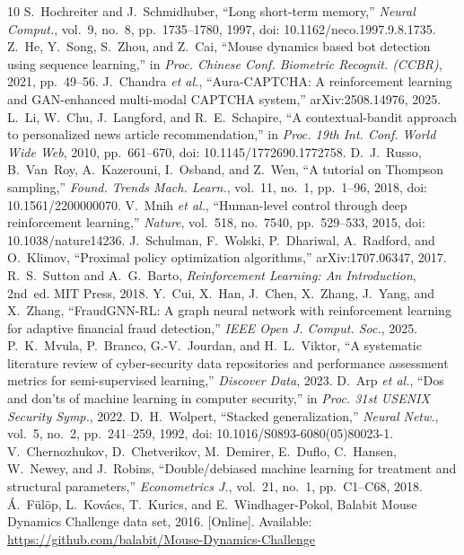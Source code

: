 \documentclass{ieeetj}
\begin{document}
\begin{thebibliography}{10}
 S.~Hochreiter and J.~Schmidhuber, ``Long short-term memory,'' \emph{Neural Comput.}, vol.~9, no.~8, pp.~1735--1780, 1997, doi: 10.1162/neco.1997.9.8.1735.
 Z.~He, Y.~Song, S.~Zhou, and Z.~Cai, ``Mouse dynamics based bot detection using sequence learning,'' in \emph{Proc. Chinese Conf. Biometric Recognit. (CCBR)}, 2021, pp.~49--56.
 J.~Chandra \emph{et al.}, ``Aura-CAPTCHA: A reinforcement learning and GAN-enhanced multi-modal CAPTCHA system,'' arXiv:2508.14976, 2025.
 L.~Li, W.~Chu, J.~Langford, and R.~E.~Schapire, ``A contextual-bandit approach to personalized news article recommendation,'' in \emph{Proc. 19th Int. Conf. World Wide Web}, 2010, pp.~661--670, doi: 10.1145/1772690.1772758.
 D.~J.~Russo, B.~Van~Roy, A.~Kazerouni, I.~Osband, and Z.~Wen, ``A tutorial on Thompson sampling,'' \emph{Found. Trends Mach. Learn.}, vol.~11, no.~1, pp.~1--96, 2018, doi: 10.1561/2200000070.
 V.~Mnih \emph{et al.}, ``Human-level control through deep reinforcement learning,'' \emph{Nature}, vol.~518, no.~7540, pp.~529--533, 2015, doi: 10.1038/nature14236.
 J.~Schulman, F.~Wolski, P.~Dhariwal, A.~Radford, and O.~Klimov, ``Proximal policy optimization algorithms,'' arXiv:1707.06347, 2017.
 R.~S.~Sutton and A.~G.~Barto, \emph{Reinforcement Learning: An Introduction}, 2nd~ed. MIT Press, 2018.
 Y.~Cui, X.~Han, J.~Chen, X.~Zhang, J.~Yang, and X.~Zhang, ``FraudGNN-RL: A graph neural network with reinforcement learning for adaptive financial fraud detection,'' \emph{IEEE Open J. Comput. Soc.}, 2025.
 P.~K.~Mvula, P.~Branco, G.-V.~Jourdan, and H.~L.~Viktor, ``A systematic literature review of cyber-security data repositories and performance assessment metrics for semi-supervised learning,'' \emph{Discover Data}, 2023.
 D.~Arp \emph{et al.}, ``Dos and don'ts of machine learning in computer security,'' in \emph{Proc. 31st USENIX Security Symp.}, 2022.
 D.~H.~Wolpert, ``Stacked generalization,'' \emph{Neural Netw.}, vol.~5, no.~2, pp.~241--259, 1992, doi: 10.1016/S0893-6080(05)80023-1.
 V.~Chernozhukov, D.~Chetverikov, M.~Demirer, E.~Duflo, C.~Hansen, W.~Newey, and J.~Robins, ``Double/debiased machine learning for treatment and structural parameters,'' \emph{Econometrics J.}, vol.~21, no.~1, pp.~C1--C68, 2018.
 \'A.~F\"ul\"op, L.~Kov\'acs, T.~Kurics, and E.~Windhager-Pokol, Balabit Mouse Dynamics Challenge data set, 2016. [Online]. Available: \url{https://github.com/balabit/Mouse-Dynamics-Challenge}

\end{thebibliography}
\end{document}
